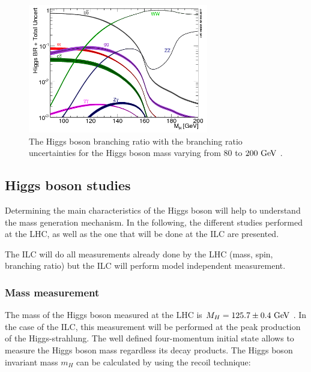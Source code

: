     \begin{figure}[!h]
      \centering
      \includegraphics[width = 0.7\textwidth]{Pictures/Higgs/BRTotalUncertBands_lm.png}
      \caption{The Higgs boson branching ratio with the branching ratio uncertainties for the Higgs boson mass varying from $80$ to $200~\rm{GeV}$ \cite{Denner:2011mq}.}
      \label{fig:higgsProd}
    \end{figure}

    \subsection{Higgs boson studies}
    
    Determining the main characteristics of the Higgs boson will help to understand the mass generation mechanism.
    In the following, the different studies performed at the \gls{LHC}, as well as the one that will be done at the \gls{ILC} are presented.

    The \gls{ILC} will do all measurements already done by the \gls{LHC} (mass, spin, branching ratio) but the \gls{ILC} will perform model independent measurement.

    \subsubsection{Mass measurement}
    \label{sec:massRecoil}

    The mass of the Higgs boson measured at the \gls{LHC} is $M_{H} = 125.7 \pm 0.4 ~\rm{GeV}$ \cite{Agashe:2014kda}.
    In the case of the \gls{ILC}, this measurement will be performed at the peak production of the Higgs-strahlung.
    The well defined four-momentum initial state allows to measure the Higgs boson mass regardless its decay products.
    The Higgs boson invariant mass $m_H$ can be calculated by using the recoil technique:

